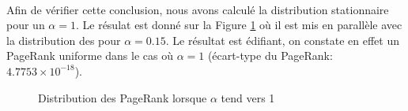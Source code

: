 \documentclass[a4paper,titlepage]{report}
\begin{document}
\paragraph{}
Afin de vérifier cette conclusion, nous avons calculé la distribution stationnaire pour un $\alpha = 1$. Le résulat est donné sur la Figure \ref{fig:q131_alpha} où il est mis en parallèle avec la distribution des pour $\alpha = 0.15$. Le résultat est édifiant, on constate en effet un PageRank uniforme dans le cas où $\alpha = 1$ (écart-type du PageRank: $4.7753\times 10^{-18}$).
\begin{figure}[h]
	\center
	\caption{Distribution des PageRank lorsque $\alpha$ tend vers 1}
	\label{fig:q131_alpha}
\end{figure}
\end{document}

